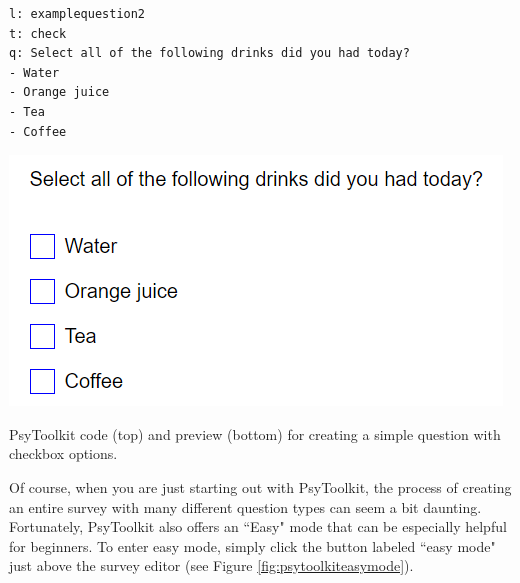 \begin{tcolorbox}[every float=\centering, drop shadow, title=PsyToolkit - Checkbox Example]
    \begin{minipage}[t]{0.9\linewidth}
    \vspace*{0pt}
    \begin{verbatim}
l: examplequestion2
t: check
q: Select all of the following drinks did you had today?
- Water
- Orange juice
- Tea
- Coffee
\end{verbatim}
    \end{minipage}\hfill%
    \tcblower
    \begin{center}
    \includegraphics[width=.5\linewidth]{PsyToolkit/Figures/SurveyCheckbox.PNG}
        \label{fig:checkboxexample}
    \end{center}
    \begin{codeblock}{PsyToolkit code (top) and preview (bottom) for creating a simple question with checkbox options.}\label{code:psytoolkitquestion}\end{codeblock}
\end{tcolorbox}

Of course, when you are just starting out with PsyToolkit, the process of creating an entire survey with many different question types can seem a bit daunting.  Fortunately, PsyToolkit also offers an ``Easy" mode that can be especially helpful for beginners.  To enter easy mode, simply click the button labeled ``easy mode" just above the survey editor (see Figure \ref{fig:psytoolkiteasymode}). 

